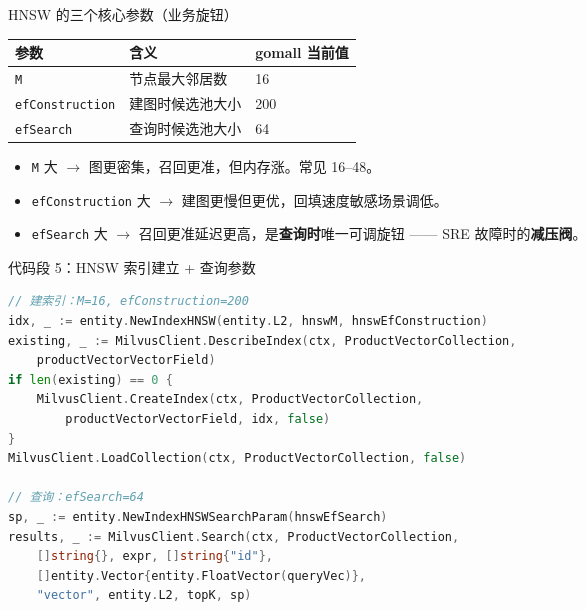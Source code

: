 \documentclass[aspectratio=169,11pt]{beamer}
\begin{document}
\begin{frame}[shrink]{HNSW 的三个核心参数（业务旋钮）}
\begin{tabular}{@{}lll@{}}
\toprule
参数              & 含义                             & gomall 当前值 \\
\midrule
\texttt{M}        & 节点最大邻居数                   & 16            \\
\texttt{efConstruction} & 建图时候选池大小            & 200           \\
\texttt{efSearch} & 查询时候选池大小                 & 64            \\
\bottomrule
\end{tabular}
\vspace{2mm}
\begin{itemize}
  \item \texttt{M} 大 $\to$ 图更密集，召回更准，但内存涨。常见 16--48。
  \item \texttt{efConstruction} 大 $\to$ 建图更慢但更优，回填速度敏感场景调低。
  \item \texttt{efSearch} 大 $\to$ 召回更准延迟更高，是\textbf{查询时}唯一可调旋钮 —— SRE 故障时的\textbf{减压阀}。
\end{itemize}
\end{frame}

\begin{frame}{代码段 5：HNSW 索引建立 + 查询参数}
\begin{lstlisting}[language=Go,firstnumber=80,basicstyle=\ttfamily\tiny]
// 建索引：M=16, efConstruction=200
idx, _ := entity.NewIndexHNSW(entity.L2, hnswM, hnswEfConstruction)
existing, _ := MilvusClient.DescribeIndex(ctx, ProductVectorCollection,
    productVectorVectorField)
if len(existing) == 0 {
    MilvusClient.CreateIndex(ctx, ProductVectorCollection,
        productVectorVectorField, idx, false)
}
MilvusClient.LoadCollection(ctx, ProductVectorCollection, false)

// 查询：efSearch=64
sp, _ := entity.NewIndexHNSWSearchParam(hnswEfSearch)
results, _ := MilvusClient.Search(ctx, ProductVectorCollection,
    []string{}, expr, []string{"id"},
    []entity.Vector{entity.FloatVector(queryVec)},
    "vector", entity.L2, topK, sp)
\end{lstlisting}
\end{frame}
\end{document}
